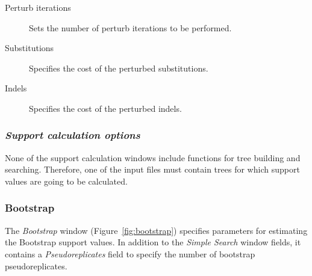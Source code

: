 \begin{description}
    \item[Perturb iterations] Sets the number of perturb iterations to be performed.
    \item[Substitutions] Specifies the cost of the perturbed substitutions.
    \item[Indels] Specifies the cost of the perturbed indels.
\end{description}

\subsubsection{\emph{Support calculation options}}

None of the support calculation windows include functions for tree building and searching. Therefore, one of the input files must contain trees for which support values are going to be calculated.

\subsubsection{Bootstrap}

The \emph{Bootstrap} window (Figure~\ref{fig:bootstrap}) specifies parameters
for estimating the Bootstrap support values. In addition to the \emph{Simple Search} window fields, it
contains a \emph{Pseudoreplicates} field to specify the number of bootstrap pseudoreplicates.

